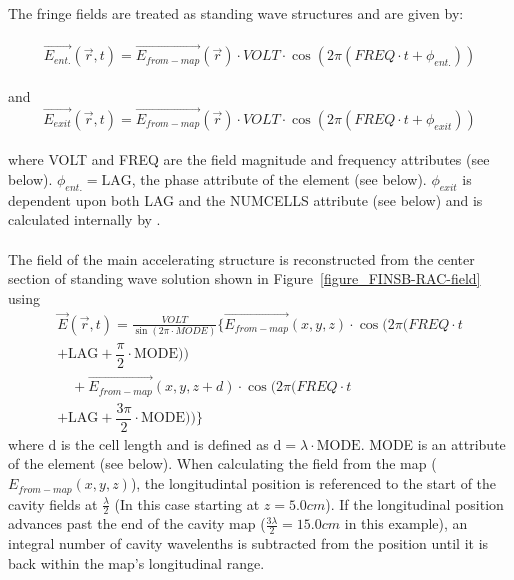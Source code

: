 \noindent The fringe fields are treated as standing wave structures and are given by:\\\\
\begin{equation*}
\vec{E_{ent.}}(\vec{r}, t) = \vec{E_{from-map}}(\vec{r}) \cdot VOLT \cdot \cos (2\pi(FREQ \cdot t + \phi_{ent.}))
\end{equation*}
\\
and
\\
\begin{equation*}
	\vec{E_{exit}}(\vec{r}, t) = \vec{E_{from-map}}(\vec{r}) \cdot VOLT \cdot \cos (2\pi(FREQ \cdot t + \phi_{exit}))
\end{equation*}
\\
where VOLT and FREQ are the field magnitude and frequency attributes (see below). 
$ \phi_{ent.}= \text{LAG}$, the phase attribute of the element (see below). $ \phi_{exit} $ is dependent upon both LAG and the NUMCELLS
attribute (see below) and is calculated internally by \opalt.
\\\\
\noindent The field of the main accelerating structure is reconstructed from the center section of standing wave solution shown in
Figure~\ref{figure_FINSB-RAC-field} using
\\
\begin{equation*}
	\begin{split}
	\vec{E}(\vec{r},t)=\frac{VOLT}{\sin (2\pi \cdot MODE)} \lbrace \vec{E_{from-map}}(x,y,z) \cdot \cos(2\pi(FREQ \cdot t \\
		+ \text{LAG} + \dfrac{\pi}{2} \cdot \text{MODE})) \\
		\quad +\vec{E_{from-map}}(x,y,z+d) \cdot \cos(2\pi(FREQ \cdot t\\
		+ \text{LAG} + \dfrac{3\pi}{2} \cdot \text{MODE})) \rbrace
	\end{split}
\end{equation*}
where d is the cell length and is defined as $\text{d} = \lambda \cdot \text{MODE} $. MODE is an attribute of the element (see below).
When calculating the field from the map ($ E_{from-map}(x,y,z) $), the longitudintal position is referenced to the start of the cavity fields
at $ \frac{\lambda}{2} $ (In this case starting at $ z = 5.0 cm $). If the longitudinal position advances past the end of the cavity map
($ \frac{3\lambda}{2} = 15.0 cm $ in this example), an integral number of cavity wavelenths is subtracted from the position until it is back
within the map's longitudinal range. \\

